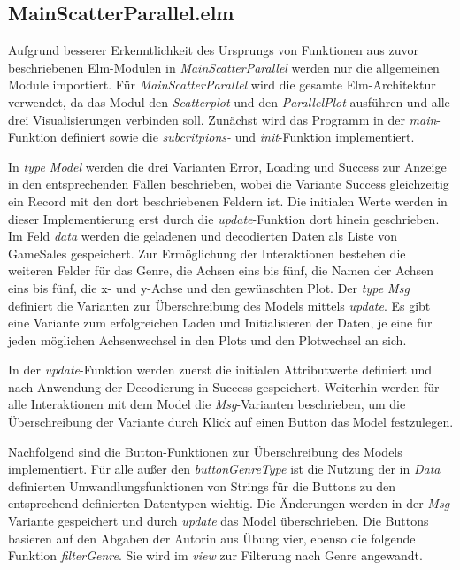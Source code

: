 \documentclass[usegeometry=true]{scrartcl}
\begin{document}
\subsection{MainScatterParallel.elm}
Aufgrund besserer Erkenntlichkeit des Ursprungs von Funktionen aus zuvor beschriebenen Elm-Modulen in \textit{MainScatterParallel}
werden nur die allgemeinen Module importiert. 
Für \textit{MainScatterParallel} wird die gesamte Elm-Architektur verwendet, da das Modul den \textit{Scatterplot} und den \textit{ParallelPlot} ausführen 
und alle drei Visualisierungen verbinden soll.
Zunächst wird das Programm in der \textit{main}-Funktion definiert sowie die \textit{subcritpions-} und \textit{init}-Funktion implementiert.

In \textit{type Model} werden die drei Varianten Error, Loading und Success zur Anzeige in den entsprechenden Fällen beschrieben, 
wobei die Variante Success gleichzeitig ein Record mit den dort beschriebenen Feldern ist. 
Die initialen Werte werden in dieser Implementierung erst durch die \textit{update}-Funktion dort hinein geschrieben.
Im Feld \textit{data} werden die geladenen und decodierten Daten als Liste von GameSales gespeichert. 
Zur Ermöglichung der Interaktionen bestehen die weiteren Felder für das Genre, die Achsen eins bis fünf, 
die Namen der Achsen eins bis fünf, die x- und y-Achse und den gewünschten Plot. 
Der \textit{type Msg} definiert die Varianten zur Überschreibung des Models mittels \textit{update}. 
Es gibt eine Variante zum erfolgreichen Laden und Initialisieren der Daten, je eine für jeden möglichen Achsenwechsel in den Plots und den Plotwechsel an sich.

In der \textit{update}-Funktion werden zuerst die initialen Attributwerte definiert und nach Anwendung der Decodierung in Success gespeichert. 
Weiterhin werden für alle Interaktionen mit dem Model die \textit{Msg}-Varianten beschrieben, 
um die Überschreibung der Variante durch Klick auf einen Button das Model festzulegen.

Nachfolgend sind die Button-Funktionen zur Überschreibung des Models implementiert.
Für alle außer den \textit{buttonGenreType} ist die Nutzung der in \textit{Data} definierten Umwandlungsfunktionen 
von Strings für die Buttons zu den entsprechend definierten Datentypen wichtig. 
Die Änderungen werden in der \textit{Msg}-Variante gespeichert und durch \textit{update} das Model überschrieben.
Die Buttons basieren auf den Abgaben der Autorin aus Übung vier, ebenso die folgende Funktion \textit{filterGenre}. 
Sie wird im \textit{view} zur Filterung nach Genre angewandt.
\end{document}

